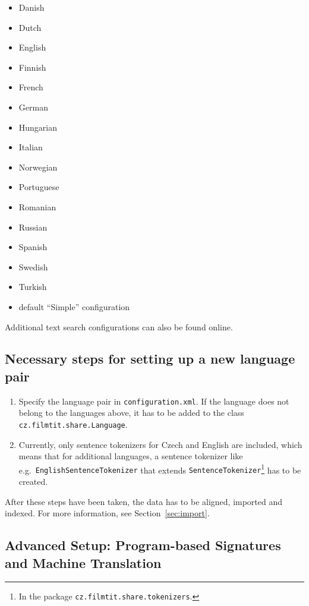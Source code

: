 \begin{itemize}
	\item Danish
	\item Dutch
	\item English
	\item Finnish
	\item French
	\item German
	\item Hungarian
	\item Italian
	\item Norwegian
	\item Portuguese
	\item Romanian
	\item Russian
	\item Spanish
	\item Swedish
	\item Turkish
	\item default “Simple” configuration
\end{itemize}

Additional text search configurations can also be found online.

\subsection*{Necessary steps for setting up a new language pair}

\begin{enumerate}
	\item Specify the language pair in {\tt configuration.xml}. If the language does not belong to the languages above, it has to be added to the class {\tt cz.filmtit.share.Language}.
	\item Currently, only sentence tokenizers for Czech and English are included, which means that for additional languages, a sentence tokenizer like e.g.\ {\tt EnglishSentenceTokenizer} that extends {\tt SentenceTokenizer}\footnote{In the package {\tt cz.filmtit.share.tokenizers}.} has to be created.
\end{enumerate}

After these steps have been taken, the data has to be aligned, imported and indexed. For more information, see Section~\ref{sec:import}.


\subsection{Advanced Setup: Program-based Signatures and Machine Translation}

